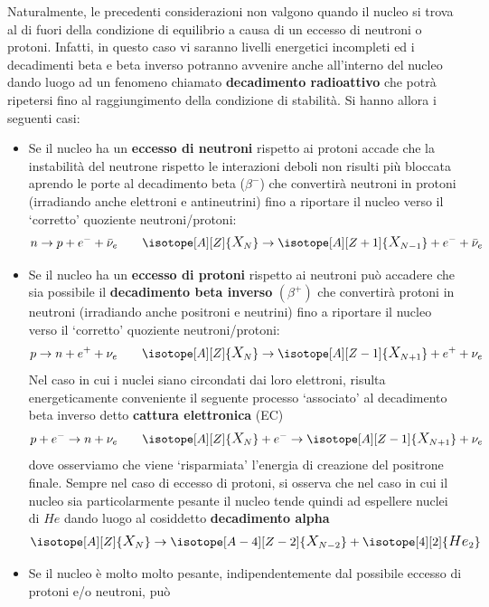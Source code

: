 Naturalmente, le precedenti considerazioni non valgono quando il nucleo si trova al di fuori della condizione di
equilibrio a causa di un eccesso di neutroni o protoni.
Infatti, in questo caso vi saranno livelli energetici incompleti ed i decadimenti beta e beta inverso potranno avvenire
anche all’interno del nucleo dando luogo ad un fenomeno chiamato \textbf{decadimento radioattivo} che potrà ripetersi fino al
raggiungimento della condizione di stabilità.
Si hanno allora i seguenti casi:

\begin{itemize}
    \item Se il nucleo ha un \textbf{eccesso di neutroni} rispetto ai protoni accade che la instabilità del neutrone rispetto le
    interazioni deboli non risulti più bloccata aprendo le porte al decadimento beta ($ \beta^{-} $) che convertirà
    neutroni in protoni (irradiando anche elettroni e antineutrini) fino a riportare il nucleo verso il `corretto’
    quoziente neutroni/protoni:
    \[
        n \to p + {e}^{-} + \bar{\nu}_e \qquad
        \isotope[A][Z]{\mathlarger{X}_{N}} \to \isotope[A][Z+1]{\mathlarger{X}_{N-1}} + {e}^{-} + \bar{\nu}_e
    \]
    \item Se il nucleo ha un \textbf{eccesso di protoni} rispetto ai neutroni può accadere che sia possibile il
    \textbf{decadimento beta inverso} $ (\beta^{+}) $ che convertirà protoni in neutroni (irradiando anche positroni e
    neutrini) fino a riportare il nucleo verso il `corretto' quoziente neutroni/protoni:
    \[
        p \to n + {e}^{+} + \nu_e \qquad
        \isotope[A][Z]{\mathlarger{X}_{N}} \to \isotope[A][Z-1]{\mathlarger{X}_{N+1}} + {e}^{+} + \nu_e
    \]
    Nel caso in cui i nuclei siano circondati dai loro elettroni, risulta energeticamente conveniente il seguente 
    processo ‘associato’ al decadimento beta inverso detto \textbf{cattura elettronica} (EC)
    \[
       p + {e}^{-} \to n + \nu_e \qquad
        \isotope[A][Z]{\mathlarger{X}_{N}} + {e}^{-} \to \isotope[A][Z-1]{\mathlarger{X}_{N+1}} + \nu_e
    \]
    dove osserviamo che viene ‘risparmiata’ l’energia di creazione del positrone finale.
    Sempre nel caso di eccesso di protoni, si osserva che nel caso in cui il nucleo sia particolarmente pesante il nucleo
    tende quindi ad espellere nuclei di $He$ dando luogo al cosiddetto \textbf{decadimento alpha}
    \[
       \isotope[A][Z]{\mathlarger{X}_{N}} \to \isotope[A -4][Z-2]{\mathlarger{X}_{N-2}} +
       \isotope[4][2]{\mathlarger{He}_{2}}
    \]
    \item Se il nucleo è molto molto pesante, indipendentemente dal possibile eccesso di protoni e/o neutroni, può

\end{itemize}
